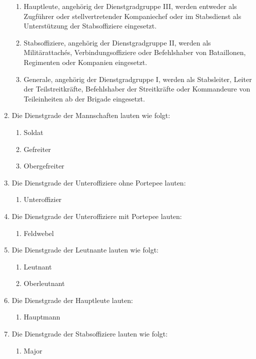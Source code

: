 \documentclass{article}
\begin{document}
\begin{enumerate}[(1)]
\begin{enumerate}[1.]
        \item Hauptleute, angehörig der Dienstgradgruppe III, werden entweder als Zugführer oder stellvertretender Kompaniechef oder im Stabsdienst
        als Unterstützung der Stabsoffiziere eingesetzt.
        \item Stabsoffiziere, angehörig der Dienstgradgruppe II, werden als Militärattachés, Verbindungsoffiziere oder Befehlshaber von Bataillonen, Regimenten oder Kompanien eingesetzt.
        \item Generale, angehörig der Dienstgradgruppe I, werden als Stabsleiter, Leiter der Teilstreitkräfte, Befehlshaber der Streitkräfte oder Kommandeure von Teileinheiten ab der Brigade eingesetzt.
    \end{enumerate}
    \item Die Dienstgrade der Mannschaften lauten wie folgt:
    \begin{enumerate}[1.]
        \item Soldat
        \item Gefreiter
        \item Obergefreiter
    \end{enumerate}
    \item Die Dienstgrade der Unteroffiziere ohne Portepee lauten:
    \begin{enumerate}[1.]
        \item Unteroffizier
    \end{enumerate}
    \item Die Dienstgrade der Unteroffiziere mit Portepee lauten:
    \begin{enumerate}[1.]
        \item Feldwebel
    \end{enumerate}
    \item Die Dienstgrade der Leutnante lauten wie folgt:
    \begin{enumerate}[1.]
        \item Leutnant
        \item Oberleutnant
    \end{enumerate}
    \item Die Dienstgrade der Hauptleute lauten:
    \begin{enumerate}[1.]
        \item Hauptmann
    \end{enumerate}
    \item Die Dienstgrade der Stabsoffiziere lauten wie folgt:
    \begin{enumerate}[1.]
        \item Major

\end{enumerate}
\end{enumerate}
\end{document}
